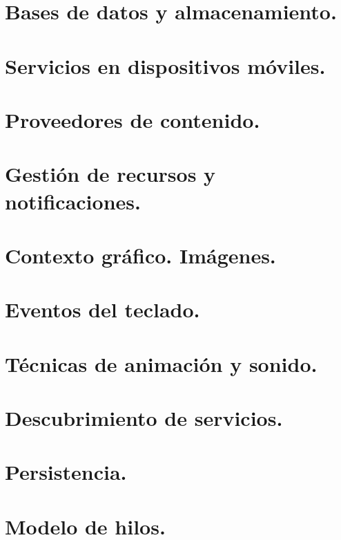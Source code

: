 \documentclass[a4paper,12pt,spanish]{sphinxmanual}
\begin{document}
\section{Bases de datos y almacenamiento.}
\label{tema2:bases-de-datos-y-almacenamiento}

\section{Servicios en dispositivos móviles.}
\label{tema2:servicios-en-dispositivos-moviles}

\section{Proveedores de contenido.}
\label{tema2:proveedores-de-contenido}

\section{Gestión de recursos y notificaciones.}
\label{tema2:gestion-de-recursos-y-notificaciones}

\section{Contexto gráfico. Imágenes.}
\label{tema2:contexto-grafico-imagenes}

\section{Eventos del teclado.}
\label{tema2:eventos-del-teclado}

\section{Técnicas de animación y sonido.}
\label{tema2:tecnicas-de-animacion-y-sonido}

\section{Descubrimiento de servicios.}
\label{tema2:descubrimiento-de-servicios}

\section{Persistencia.}
\label{tema2:persistencia}

\section{Modelo de hilos.}
\label{tema2:modelo-de-hilos}
\end{document}
